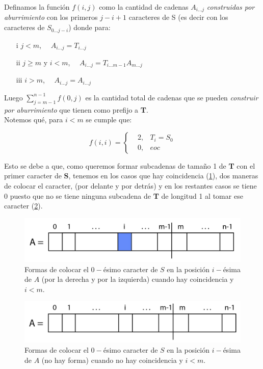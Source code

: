 \documentclass[a4paper]{article}
\begin{document}
    Definamos la funci\'on $f(i,j)$ como la cantidad de cadenas $A_{i...j}$ \textit{construidas por aburrimiento} con los primeros $j-i+1$ 
    caracteres de S (es decir con los caracteres de $S_{0...j-i}$) donde 
    para:
    \begin{itemize}
    	\item[i] $j < m$, $\quad A_{i...j} = T_{i...j}$
    	\item[ii] $j \geq m $ y $i < m $, $\quad A_{i...j} = T_{i...m-1}A_{m...j}$
    	\item[iii] $i > m $, $\quad A_{i...j} = A_{i...j}$
    \end{itemize}
    
    Luego $\sum_{j= m-1}^{n-1}f(0,j)$ es la cantidad total de cadenas que se pueden \textit{construir por aburrimiento} que tienen como prefijo a \textbf{T}.\\
    
    Notemos qu\'e, para $i < m$ se cumple que: %

    \begin{equation}\label{eq:1}
        f(i,i) = \left\{ \begin{aligned}
            &2, &T_i = S_0\\
            &0, &eoc
        \end{aligned} \right.
    \end{equation}

    Esto se debe a que, como queremos formar subcadenas de tama\~no 1 de \textbf{T} con el primer caracter de \textbf{S}, tenemos en los casos que hay coincidencia (\ref{fig:ppp1}), dos maneras de colocar el caracter, (por delante y por detr\'as) y en los restantes casos 
    se tiene 0 puesto que no se tiene ninguna subcadena de \textbf{T} de longitud 1 al tomar ese caracter (\ref{fig:ppp0}).\\
        
    \begin{figure}[!h]
    	\centering
    	\includegraphics[width=0.7\linewidth]{ppp1}
    	\caption{Formas de colocar el $0-$ésimo caracter de $S$ en la posición $i-$ésima de $A$ (por la derecha y por la izquierda) cuando hay coincidencia y $i<m$.}
    	\label{fig:ppp1}
    \end{figure}

	\begin{figure}[!h]
		\centering
		\includegraphics[width=0.7\linewidth]{ppp0}
		\caption{Formas de colocar el $0-$ésimo caracter de $S$ en la posición $i-$ésima de $A$ (no hay forma) cuando no hay coincidencia y $i<m$.}
		\label{fig:ppp0}
	\end{figure}
\end{document}
